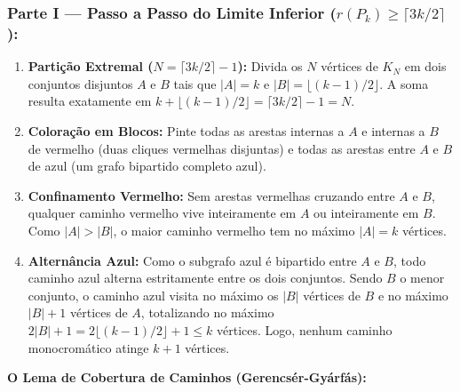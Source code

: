 \documentclass[11pt, a4paper]{article}
\begin{document}
\subsubsection{Parte I --- Passo a Passo do Limite Inferior ($r(P_k) \ge \lceil 3k/2 \rceil$):}
\begin{enumerate}
    \item \textbf{Partição Extremal ($N = \lceil 3k/2 \rceil - 1$):} Divida os $N$ vértices de $K_N$ em dois conjuntos disjuntos $A$ e $B$ tais que $|A| = k$ e $|B| = \lfloor (k-1)/2 \rfloor$. A soma resulta exatamente em $k + \lfloor (k-1)/2 \rfloor = \lceil 3k/2 \rceil - 1 = N$.
    \item \textbf{Coloração em Blocos:} Pinte todas as arestas internas a $A$ e internas a $B$ de vermelho (duas cliques vermelhas disjuntas) e todas as arestas entre $A$ e $B$ de azul (um grafo bipartido completo azul).
    \item \textbf{Confinamento Vermelho:} Sem arestas vermelhas cruzando entre $A$ e $B$, qualquer caminho vermelho vive inteiramente em $A$ ou inteiramente em $B$. Como $|A| > |B|$, o maior caminho vermelho tem no máximo $|A| = k$ vértices.
    \item \textbf{Alternância Azul:} Como o subgrafo azul é bipartido entre $A$ e $B$, todo caminho azul alterna estritamente entre os dois conjuntos. Sendo $B$ o menor conjunto, o caminho azul visita no máximo os $|B|$ vértices de $B$ e no máximo $|B| + 1$ vértices de $A$, totalizando no máximo $2|B| + 1 = 2\lfloor (k-1)/2 \rfloor + 1 \le k$ vértices. Logo, nenhum caminho monocromático atinge $k+1$ vértices.
\end{enumerate}

\newpage

\textbf{O Lema de Cobertura de Caminhos (Gerencsér-Gyárfás):}
\end{document}
